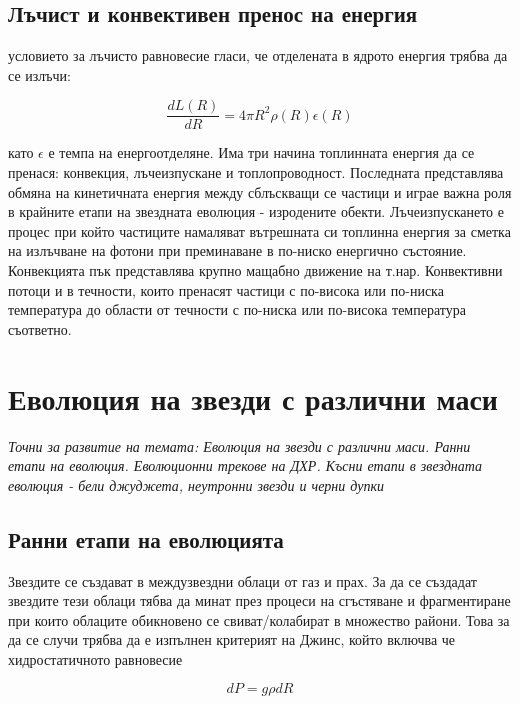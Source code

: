 \documentclass[a4paper,12pt]{article}
\begin{document}
\subsection{Лъчист и конвективен пренос на енергия}

условието за лъчисто равновесие гласи, че отделената в ядрото енергия трябва да се излъчи:

\begin{equation}
\frac{dL(R)} {dR}= 4\pi R^2 \rho(R) \epsilon(R)
\end{equation}

като $\epsilon$ е темпа на енергоотделяне. Има три начина топлинната енергия да се пренася: конвекция, лъчеизпускане и топлопроводност. Последната представлява обмяна на кинетичната енергия между сблъскващи се частици и играе важна роля в крайните етапи на звездната еволюция - изродените обекти. Лъчеизпускането е процес при който частиците намаляват вътрешната си топлинна енергия за сметка на излъчване на фотони при преминаване в по-ниско енергично състояние. Конвекцията пък представлява крупно мащабно движение на т.нар. Конвективни потоци и в течности, които пренасят частици с по-висока или по-ниска температура до области от течности с по-ниска или по-висока температура съответно.


\section{Еволюция на звезди с различни маси}
\textit{Точни за развитие на темата: Еволюция на звезди с различни маси. Ранни етапи на еволюция. Еволюционни трекове на ДХР. Късни етапи в звездната еволюция - бели джуджета, неутронни звезди и черни дупки}


\subsection{Ранни етапи на еволюцията}
Звездите се създават в междузвездни облаци от газ и прах. За да се създадат звездите тези облаци тябва да минат през процеси на сгъстяване и фрагментиране при които облаците обикновено се свиват/колабират в множество райони. Това за да се случи трябва да е изпълнен критерият на Джинс, който включва че хидростатичното равновесие

\begin{equation}
    dP = g\rho dR
\end{equation}
\end{document}
